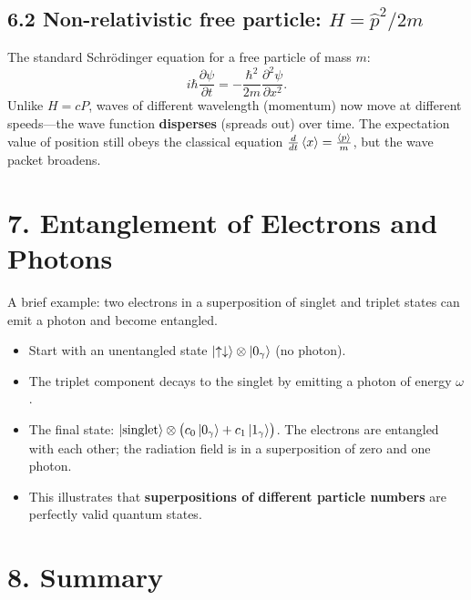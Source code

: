 \documentclass[12pt,a4paper]{article}
\begin{document}
\subsection{6.2 Non-relativistic free particle: $H=\hat{p}^2/2m$}
The standard Schr\"odinger equation for a free particle of mass $m$:
\[
    \boxed{i\hbar\frac{\partial\psi}{\partial t} = -\frac{\hbar^2}{2m}\frac{\partial^2\psi}{\partial x^2}.}
\]
Unlike $H=cP$, waves of different wavelength (momentum) now move at different speeds---the wave function \textbf{disperses} (spreads out) over time.  The expectation value of position still obeys the classical equation $\frac{d}{dt}\expval{x}=\frac{\expval{p}}{m}$, but the wave packet broadens.

\section{7. Entanglement of Electrons and Photons}

A brief example: two electrons in a superposition of singlet and triplet states can emit a photon and become entangled.

\begin{itemize}[nosep]
    \item Start with an unentangled state $\ket{\uparrow\downarrow}\otimes\ket{0_\gamma}$ (no photon).
    \item The triplet component decays to the singlet by emitting a photon of energy $\omega$.
    \item The final state: $\ket{\text{singlet}}\otimes\bigl(c_0\ket{0_\gamma}+c_1\ket{1_\gamma}\bigr)$.  The electrons are entangled with each other; the radiation field is in a superposition of zero and one photon.
    \item This illustrates that \textbf{superpositions of different particle numbers} are perfectly valid quantum states.
\end{itemize}

\section{8. Summary}
\end{document}

